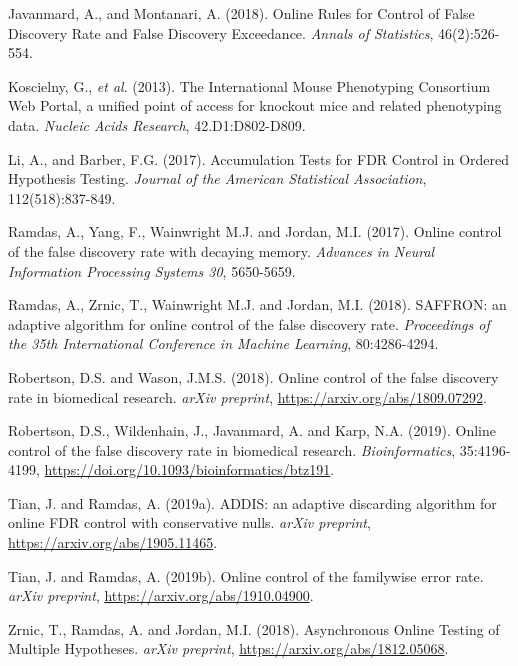 \documentclass[
]{article}
\begin{document}
Javanmard, A., and Montanari, A. (2018). Online Rules for Control of
False Discovery Rate and False Discovery Exceedance. \emph{Annals of
Statistics}, 46(2):526-554.

Koscielny, G., \emph{et al}. (2013). The International Mouse Phenotyping
Consortium Web Portal, a unified point of access for knockout mice and
related phenotyping data. \emph{Nucleic Acids Research},
42.D1:D802-D809.

Li, A., and Barber, F.G. (2017). Accumulation Tests for FDR Control in
Ordered Hypothesis Testing. \emph{Journal of the American Statistical
Association}, 112(518):837-849.

Ramdas, A., Yang, F., Wainwright M.J. and Jordan, M.I. (2017). Online
control of the false discovery rate with decaying memory. \emph{Advances
in Neural Information Processing Systems 30}, 5650-5659.

Ramdas, A., Zrnic, T., Wainwright M.J. and Jordan, M.I. (2018). SAFFRON:
an adaptive algorithm for online control of the false discovery rate.
\emph{Proceedings of the 35th International Conference in Machine
Learning}, 80:4286-4294.

Robertson, D.S. and Wason, J.M.S. (2018). Online control of the false
discovery rate in biomedical research. \emph{arXiv preprint},
\url{https://arxiv.org/abs/1809.07292}.

Robertson, D.S., Wildenhain, J., Javanmard, A. and Karp, N.A. (2019).
Online control of the false discovery rate in biomedical research.
\emph{Bioinformatics}, 35:4196-4199,
\url{https://doi.org/10.1093/bioinformatics/btz191}.

Tian, J. and Ramdas, A. (2019a). ADDIS: an adaptive discarding algorithm
for online FDR control with conservative nulls. \emph{arXiv preprint},
\url{https://arxiv.org/abs/1905.11465}.

Tian, J. and Ramdas, A. (2019b). Online control of the familywise error
rate. \emph{arXiv preprint}, \url{https://arxiv.org/abs/1910.04900}.

Zrnic, T., Ramdas, A. and Jordan, M.I. (2018). Asynchronous Online
Testing of Multiple Hypotheses. \emph{arXiv preprint},
\url{https://arxiv.org/abs/1812.05068}.
\end{document}
